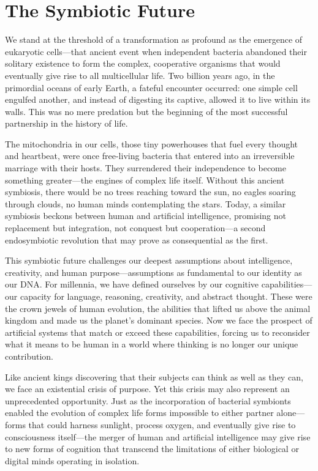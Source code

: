 \chapter{The Symbiotic Future}

We stand at the threshold of a transformation as profound as the emergence of eukaryotic cells—that ancient event when independent bacteria abandoned their solitary existence to form the complex, cooperative organisms that would eventually give rise to all multicellular life. Two billion years ago, in the primordial oceans of early Earth, a fateful encounter occurred: one simple cell engulfed another, and instead of digesting its captive, allowed it to live within its walls. This was no mere predation but the beginning of the most successful partnership in the history of life.

The mitochondria in our cells, those tiny powerhouses that fuel every thought and heartbeat, were once free-living bacteria that entered into an irreversible marriage with their hosts. They surrendered their independence to become something greater—the engines of complex life itself. Without this ancient symbiosis, there would be no trees reaching toward the sun, no eagles soaring through clouds, no human minds contemplating the stars. Today, a similar symbiosis beckons between human and artificial intelligence, promising not replacement but integration, not conquest but cooperation—a second endosymbiotic revolution that may prove as consequential as the first.

This symbiotic future challenges our deepest assumptions about intelligence, creativity, and human purpose—assumptions as fundamental to our identity as our DNA. For millennia, we have defined ourselves by our cognitive capabilities—our capacity for language, reasoning, creativity, and abstract thought. These were the crown jewels of human evolution, the abilities that lifted us above the animal kingdom and made us the planet's dominant species. Now we face the prospect of artificial systems that match or exceed these capabilities, forcing us to reconsider what it means to be human in a world where thinking is no longer our unique contribution.

Like ancient kings discovering that their subjects can think as well as they can, we face an existential crisis of purpose. Yet this crisis may also represent an unprecedented opportunity. Just as the incorporation of bacterial symbionts enabled the evolution of complex life forms impossible to either partner alone—forms that could harness sunlight, process oxygen, and eventually give rise to consciousness itself—the merger of human and artificial intelligence may give rise to new forms of cognition that transcend the limitations of either biological or digital minds operating in isolation.

